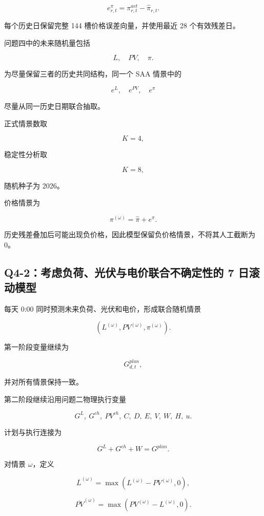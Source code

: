 \begin{equation}
e^\pi_{r,t}
=
\pi^{act}_{r,t}
-
\hat\pi_{r,t}.
\end{equation}

每个历史日保留完整 144 槽价格误差向量，并使用最近 28 个有效残差日。

问题四中的未来随机量包括

\[
L,\quad PV,\quad \pi.
\]

为尽量保留三者的历史共同结构，同一个 SAA 情景中的

\[
e^L,\quad e^{PV},\quad e^\pi
\]

尽量从同一历史日期联合抽取。

正式情景数取

\[
K=4,
\]

稳定性分析取

\[
K=8,
\]

随机种子为 2026。

价格情景为

\begin{equation}
\pi^{(\omega)}
=
\hat\pi+e^\pi.
\end{equation}

历史残差叠加后可能出现负价格，因此模型保留负价格情景，不将其人工截断为 0。

\subsection{Q4-2：考虑负荷、光伏与电价联合不确定性的 7 日滚动模型}

每天 0:00 同时预测未来负荷、光伏和电价，形成联合随机情景

\[
\left(
L^{(\omega)},
PV^{(\omega)},
\pi^{(\omega)}
\right).
\]

第一阶段变量继续为

\[
G^{plan}_{d,t},
\]

并对所有情景保持一致。

第二阶段继续沿用问题二物理执行变量

\[
G^L,\ G^{ch},\ PV^{ch},\ C,\ D,\ E,\ V,\ W,\ H,\ u.
\]

计划与执行连接为

\begin{equation}
G^L+G^{ch}+W
=
G^{plan}.
\end{equation}

对情景 \(\omega\)，定义

\[
\overline L^{(\omega)}
=
\max(L^{(\omega)}-PV^{(\omega)},0),
\]

\[
\overline{PV}^{(\omega)}
=
\max(PV^{(\omega)}-L^{(\omega)},0).
\]

